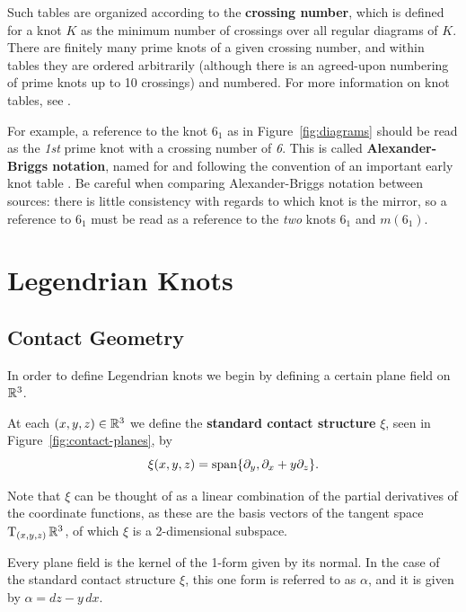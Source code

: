 Such tables are organized according to the \textbf{crossing number}, which is defined for a knot $K$ as the minimum number of crossings over all regular diagrams of $K$.
There are finitely many prime knots of a given crossing number, and within tables they are ordered arbitrarily (although there is an agreed-upon numbering of prime knots up to 10 crossings) and numbered. For more information on knot tables, see \cite{hoste}.

For example, a reference to the knot $6_1$ as in Figure~\ref{fig:diagrams} should be read as the \emph{1st} prime knot with a crossing number of \emph{6}. This is called \textbf{Alexander-Briggs notation}, named for and following the convention of an important early knot table \cite{alexander-briggs}. Be careful when comparing Alexander-Briggs notation between sources: there is little consistency with regards to which knot is the mirror, so a reference to $6_1$ must be read as a reference to the \emph{two} knots $6_1$ and $m(6_1)$.

\section{Legendrian Knots}\label{sec:legendrian}
\subsection{Contact Geometry}\label{subsec:contact}

In order to define Legendrian knots we begin by defining a certain plane field on $\mathbb{R}^3$.

\begin{definition}\label{defn:xi}
    At each $(x, y, z) \in \mathbb{R}^3$ we define the \textbf{standard contact structure} $\xi$, seen in Figure~\ref{fig:contact-planes}, by 
    \[
        \xi(x, y, z) = \operatorname{span} \{\partial_y, \partial_x + y\partial_z\}.
    \]
\end{definition}

Note that $\xi$ can be thought of as a linear combination of the partial derivatives of the coordinate functions, as these are the basis vectors of the tangent space $\operatorname{T}_{(x, y, z)} \mathbb{R}^3$, of which $\xi$ is a 2-dimensional subspace.

Every plane field is the kernel of the 1-form given by its normal. In the case of the standard contact structure $\xi$, this one form is referred to as $\alpha$, and it is given by ${\alpha = dz - y \, dx}$.


